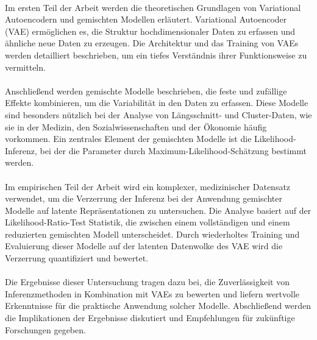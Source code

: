 \documentclass[%
thesis=student,%
coverpage=false,%
titlepage=false,%
headmarks=true, %
german,%
font=libertine, %
math=newpxtx, %
BCOR=5mm,%
coverBCOR=11mm%
]{tumbook}
\theoremstyle{break}
\begin{document}
\\
Im ersten Teil der Arbeit werden die theoretischen Grundlagen von Variational Autoencodern  und gemischten Modellen erläutert. Variational Autoencoder (VAE) ermöglichen es, die Struktur hochdimensionaler Daten zu erfassen und ähnliche neue Daten zu erzeugen. Die Architektur und das Training von VAEs werden detailliert beschrieben, um ein tiefes Verständnis ihrer Funktionsweise zu vermitteln.\\
\\
Anschließend werden gemischte Modelle beschrieben, die feste und zufällige Effekte kombinieren, um die Variabilität in den Daten zu erfassen. Diese Modelle sind besonders nützlich bei der Analyse von Längsschnitt- und Cluster-Daten, wie sie in der Medizin, den Sozialwissenschaften und der Ökonomie häufig vorkommen. Ein zentrales Element der gemischten Modelle ist die Likelihood-Inferenz, bei der die Parameter durch Maximum-Likelihood-Schätzung bestimmt werden.\\
\\
Im empirischen Teil der Arbeit wird ein komplexer,  medizinischer Datensatz verwendet, um die Verzerrung der Inferenz bei der Anwendung gemischter Modelle auf latente Repräsentationen zu untersuchen. Die Analyse basiert auf der Likelihood-Ratio-Test Statistik, die zwischen einem vollständigen und einem reduzierten gemischten Modell unterscheidet. Durch wiederholtes Training und Evaluierung dieser Modelle auf der latenten Datenwolke des VAE wird die Verzerrung quantifiziert und bewertet.\\
\\
Die Ergebnisse dieser Untersuchung tragen dazu bei, die Zuverlässigkeit von Inferenzmethoden in Kombination mit VAEs zu bewerten und liefern wertvolle Erkenntnisse für die praktische Anwendung solcher Modelle. Abschließend werden die Implikationen der Ergebnisse diskutiert und Empfehlungen für zukünftige Forschungen gegeben.\\
\\

\end{document}
